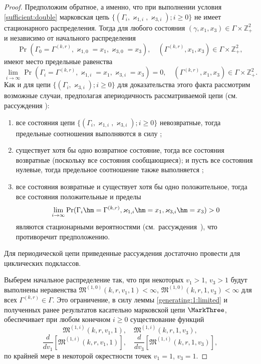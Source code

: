 \begin{proof}
Предположим обратное,  а именно,  что при выполнении условия \eqref{sufficient:double} марковская цепь $\{(\Gamma_i,  \varkappa_{1, i}, \varkappa_{3, i}); i \geqslant 0\}$ не имеет стационарного распределения. 
Тогда для любого состояния $(\gamma, x_1, x_3)\in \Gamma \times {\mathbb Z}^2_+$ и независимо от начального распределения 
$$
\Pr(\Gamma_{0}=\Gamma^{(k, r)},  \varkappa_{1, 0}=x_1,  \varkappa_{3, 0}=x_3), \quad (\Gamma^{(k, r)}, x_1, x_3)\in \Gamma \times {\mathbb Z}^2_+,
$$
имеют место предельные равенства 
\begin{equation}
\lim_{i \to \infty} \Pr(\Gamma_{i}=\Gamma^{(k, r)},  \varkappa_{1, i}=x_1,  \varkappa_{3, i}=x_3) =0,  \quad  (\Gamma^{(k, r)}, x_1, x_3)\in \Gamma \times {\mathbb Z}^2_+.
\label{zero:limit:equations:1}
\end{equation} 
Как и для цепи $\{(\Gamma_i,  \varkappa_{3, i}); i \geqslant 0\}$ для доказательства этого факта рассмотрим возможные случаи,  предполагая апериодичность рассматриваемой цепи (см. рассуждения \cite[гл. $3$,   \S~3-4]{Shiryaev}):
\begin{enumerate}
\item все состояния цепи $\{(\Gamma_i,  \varkappa_{1, i}, \varkappa_{3, i}); i \geqslant 0\}$ невозвратные,  тогда предельные соотношения выполняются в силу \cite[с. 541,  лемма $2$]{Shiryaev};
\item существует хотя бы одно возвратное состояние,  тогда все состояния возвратные (поскольку все состояния сообщающиеся); и пусть все состояния нулевые,  тогда предельное соотношение также выполняется \cite[с. 541,  лемма $3$]{Shiryaev};
\item все состояния возвратные и существует хотя бы одно положительное,  тогда все состояния положительные и пределы 
$$
\lim_{i \to \infty} \Pr(\Gamma_{i}\hm= \Gamma^{(k, r)},  \varkappa_{1, i}\hm= x_1,  \varkappa_{3, i}\hm= x_3) > 0
$$ являются стационарными вероятностями (см.~рассуждения~{\cite[с. 549,  теорема $1$]{Shiryaev}}),  что противоречит предположению.
\end{enumerate}
Для периодической цепи приведенные рассуждения достаточно провести для циклических подклассов.

Выберем начальное распределение так,  что при некоторых $v_1 >1$,  $v_3 >1$ будут выполнены неравенства $\mathfrak{M}^{(1, 0)}(k, r, v_1, 1) <\infty$,  $\mathfrak{M}^{(1, 0)}(k, r, 1, v_3) <\infty$ для всех $\Gamma^{(k, r)}\in \Gamma$. Это ограничение,  в силу леммы \eqref{generating:1:limited} и полученных ранее результатов касательно марковской цепи ${\MarkThree}$,  обеспечивает при любом конечном $i\geqslant 0$ существование функций 
\begin{equation}
\mathfrak{M}^{(1, i)}(k, r, v_1, 1),  \quad \mathfrak{M}^{(1, i)}(k, r, 1, v_3),
\end{equation}
\begin{equation}
\frac{d}{dv_1} \left[\mathfrak{M}^{(1, i)}(k, r, v_1, 1)\right],  \quad \frac{d}{dv_3} \left[\mathfrak{M}^{(1, i)}(k, r, 1, v_3)\right],
\end{equation}
по крайней мере в некоторой окрестности точек $v_1 = 1$,  $v_3=1$.


\end{proof}
